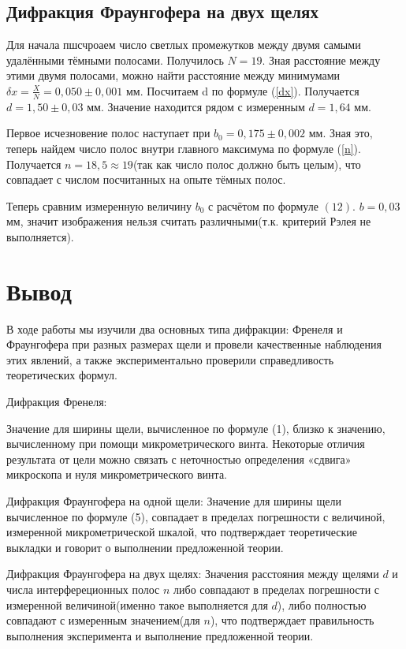 \documentclass[a4paper,12pt]{article}
\begin{document}
\subsection{Дифракция Фраунгофера на двух щелях}
Для начала пшсчроаем число светлых промежутков между двумя самыми удалёнными тёмными полосами. Получилось $N = 19$. Зная расстояние между этими двумя полосами, можно найти расстояние между минимумами $\delta x = \frac{X}{N} = 0,050 \pm 0,001$ мм. Посчитаем d по формуле (\ref{dx}). Получается $d = 1,50 \pm 0,03$ мм. Значение находится рядом с измеренным $d = 1,64$ мм.

Первое исчезновение полос наступает при $b_0 = 0,175 \pm 0,002$ мм. Зная это, теперь найдем число полос внутри главного максимума по формуле (\ref{n}). Получается $n = 18,5 \approx 19$(так как число полос должно быть целым), что совпадает с числом посчитанных на опыте тёмных полос. 

Теперь сравним измеренную величину $b_0$ с расчётом по формуле $(12)$. $b = 0,03$ мм, значит изображения нельзя считать различными(т.к. критерий Рэлея не выполняется).


\section{Вывод}
В ходе работы мы изучили два основных типа дифракции: Френеля и 
Фраунгофера при разных размерах щели и провели качественные 
наблюдения этих явлений, а также экспериментально проверили 
справедливость теоретических формул.

Дифракция Френеля: 

Значение для ширины щели, вычисленное по формуле (1), близко к значению, вычисленному при помощи микрометрического винта. Некоторые отличия 
результата от цели можно связать с неточностью определения 
«сдвига» микроскопа и нуля микрометрического винта. 

Дифракция Фраунгофера на одной щели: 
Значение для ширины щели вычисленное по формуле (5), совпадает в пределах погрешности с величиной, измеренной микрометрической шкалой, что подтверждает теоретические выкладки и говорит о выполнении предложенной теории.

Дифракция Фраунгофера на двух щелях:
Значения расстояния между щелями $d$ и числа интерфереционных полос $n$ либо совпадают в пределах погрешности с измеренной величиной(именно такое выполняется для $d$), либо полностью совпадают с измеренным значением(для $n$), что подтверждает правильность выполнения эксперимента и выполнение предложенной теории.
\end{document}
